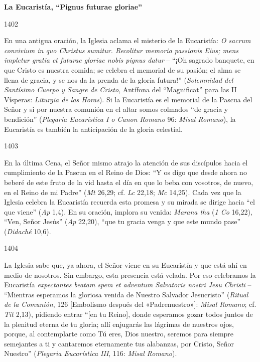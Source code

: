 			\begin{ccebody}\textbf{La Eucaristía, “Pignus futurae gloriae”}\end{ccebody}
			
			\begin{ccebody}\begin{ccenumber}1402\end{ccenumber} En una antigua oración, la Iglesia aclama el misterio de la Eucaristía: \textit{O sacrum convivium in quo Christus sumitur. Recolitur memoria passionis Eius; mens impletur gratia et futurae gloriae nobis pignus datur} – “¡Oh sagrado banquete, en que Cristo es nuestra comida; se celebra el memorial de su pasión; el alma se llena de gracia, y se nos da la prenda de la gloria futura!” (\textit{Solemnidad del Santísimo Cuerpo y Sangre de Cristo}, Antífona del “Magnificat” para las II Vísperas: \textit{Liturgia de las Horas}). Si la Eucaristía es el memorial de la Pascua del Señor y si por nuestra comunión en el altar somos colmados “de gracia y bendición” (\textit{Plegaria Eucarística I o Canon Romano} 96: \textit{Misal Romano}), la Eucaristía es también la anticipación de la gloria celestial.\end{ccebody}
			
			\begin{ccebody}\begin{ccenumber}1403\end{ccenumber} En la última Cena, el Señor mismo atrajo la atención de sus discípulos hacia el cumplimiento de la Pascua en el Reino de Dios: “Y os digo que desde ahora no beberé de este fruto de la vid hasta el día en que lo beba con vosotros, de nuevo, en el Reino de mi Padre” (\textit{Mt} 26,29; cf. \textit{Lc} 22,18; \textit{Mc} 14,25). Cada vez que la Iglesia celebra la Eucaristía recuerda esta promesa y su mirada se dirige hacia “el que viene” (\textit{Ap} 1,4). En su oración, implora su venida: \textit{Marana tha} (\textit{1 Co} 16,22), “Ven, Señor Jesús” (\textit{Ap} 22,20), “que tu gracia venga y que este mundo pase” (\textit{Didaché} 10,6).\end{ccebody}
			
			\begin{ccebody}\begin{ccenumber}1404\end{ccenumber} La Iglesia sabe que, ya ahora, el Señor viene en su Eucaristía y que está ahí en medio de nosotros. Sin embargo, esta presencia está velada. Por eso celebramos la Eucaristía \textit{expectantes beatam spem et adventum Salvatoris nostri Jesu Christi} – “Mientras esperamos la gloriosa venida de Nuestro Salvador Jesucristo” (\textit{Ritual de la Comunión}, 126 [Embolismo después del «Padrenuestro»]: \textit{Misal Romano}; cf. \textit{Tit} 2,13), pidiendo entrar “[en tu Reino], donde esperamos gozar todos juntos de la plenitud eterna de tu gloria; allí enjugarás las lágrimas de nuestros ojos, porque, al contemplarte como Tú eres, Dios nuestro, seremos para siempre semejantes a ti y cantaremos eternamente tus alabanzas, por Cristo, Señor Nuestro” (\textit{Plegaria Eucarística III}, 116: \textit{Misal Romano}).\end{ccebody}
			
